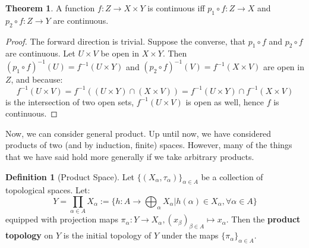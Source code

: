 \documentclass[11pt, oneside]{amsart}   	%
\theoremstyle{definition}
\newtheorem{definition}{Definition}[section]
\newtheorem{theorem}{Theorem}[section]
\begin{document}
	\begin{theorem}
		A function $f : Z\rightarrow X\times Y$ is continuous iff $p_1\circ f : Z\rightarrow X$ and $p_2\circ f : Z\rightarrow Y$ are continuous.
	\end{theorem}
	
	\begin{proof}
		The forward direction is trivial. Suppose the converse, that $p_1\circ f$ and $p_2\circ f$ are continuous. Let $U\times V$ be open in $X\times Y$. 
		Then $(p_1\circ f)^{-1}(U) = f^{-1}(U\times Y)$ and $(p_2\circ f)^{-1}(V) = f^{-1}(X\times V)$ are open in $Z$, and because:
		$$
			f^{-1}(U\times V) = f^{-1}((U\times Y)\cap (X\times V)) = f^{-1}(U\times Y)\cap f^{-1}(X\times V)
		$$
		is the intersection of two open sets, $f^{-1}(U\times V)$ is open as well, hence $f$ is continuous.
	\end{proof}
	
	Now, we can consider general product. Up until now, we have considered products of two (and by induction, finite) spaces. However, many of the things that 
	we have said hold more generally if we take arbitrary products.
	
	\begin{definition}[Product Space]
		Let $\{(X_\alpha, \tau_\alpha)\}_{\alpha\in A}$ be a collection of topological spaces. Let:
		$$
			Y = \prod_{\alpha\in A} X_\alpha := \{h : A\rightarrow\bigoplus_\alpha X_\alpha | h(\alpha)\in X_\alpha, \forall\alpha\in A\}
		$$
		equipped with projection maps $\pi_\alpha : Y\rightarrow X_\alpha, (x_\beta)_{\beta\in A}\mapsto x_\alpha$. Then the \textbf{product topology} on $Y$ 
		is the initial topology of $Y$ under the maps $\{\pi_\alpha\}_{\alpha\in A}$.
	\end{definition}
	
\end{document}
